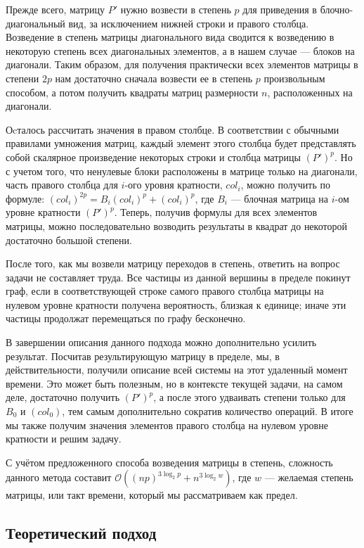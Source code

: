 Прежде всего, матрицу $P'$ нужно возвести в степень $p$ для приведения в блочно-диагональный вид, за исключением нижней строки и правого столбца. Возведение в степень матрицы диагонального вида сводится к возведению в некоторую степень всех диагональных элементов, а в нашем случае --- блоков на диагонали. Таким образом, для получения практически всех элементов матрицы в степени $2p$ нам достаточно сначала возвести ее в степень $p$ произвольным способом, а потом получить квадраты матриц размерности $n$, расположенных на диагонали. 

Оcталось рассчитать значения в правом столбце. В соответствии с обычными правилами умножения матриц, каждый элемент этого столбца будет представлять собой скалярное произведение некоторых строки и столбца матрицы $(P')^p$. Но с учетом того, что ненулевые блоки расположены в матрице только на диагонали, часть правого столбца для $i$-ого уровня кратности, $col_i$, можно получить по формуле: $(col_i)^{2p} = B_i(col_i)^{p} + (col_i)^{p}$, где $B_i$ --- блочная матрица на $i$-ом уровне кратности $(P')^p$. Теперь, получив формулы для всех элементов матрицы, можно последовательно возводить результаты в квадрат до некоторой достаточно большой степени.

После того, как мы возвели матрицу переходов в степень, ответить на вопрос задачи не составляет труда. Все частицы из данной вершины в пределе покинут граф, если в соответствующей строке самого правого столбца матрицы на нулевом уровне кратности получена вероятность, близкая к единице; иначе эти частицы продолжат перемещаться по графу бесконечно. 

В завершении описания данного подхода можно дополнительно усилить результат. Посчитав результирующую матрицу в пределе, мы, в действительности, получили описание всей системы на этот удаленный момент времени. Это может быть полезным, но в контексте текущей задачи, на самом деле, достаточно получить $(P')^p$, а после этого удваивать степени только для $B_0$ и $(col_0)$, тем самым дополнительно сократив количество операций. В итоге мы также получим значения элементов правого столбца на нулевом уровне кратности и решим задачу. 

С учётом предложенного способа возведения матрицы в степень, сложность данного метода составит $\mathcal{O}((np)^{3 \log_2 p} + n^{3 \log_2 w})$, где $w$ --- желаемая степень матрицы, или такт времени, который мы рассматриваем как предел.

\subsection{Теоретический подход}

